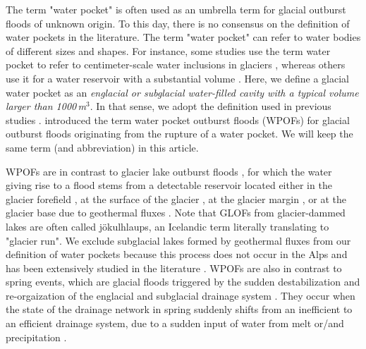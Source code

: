 The term "water pocket" is often used as an umbrella term for glacial outburst floods of unknown origin. To this day, there is no consensus on the definition of water pockets in the literature. The term "water pocket" can refer to water bodies of different sizes and shapes. For instance, some studies use the term water pocket to refer to centimeter-scale water inclusions in glaciers \citep[]{Vivian&Bocquet1973,Raymond&Harrison1975,Holmlund1988,Fountain&Walder1998,Murray&al2000b}, whereas others use it for a water reservoir with a substantial volume \citep[]{Beecroft1983, Haeberli&al1989,Tweed&Russel1999,Vincent&al2010b}. Here, we define a glacial water pocket as an {\it englacial or subglacial water-filled cavity with a typical volume larger than 1000\,m$^3$}. In that sense, we adopt the definition used in previous studies \citep[]{Haeberli&al1989,Deline&al2004,Roberts2005, Vincent&al2010b}. \cite{Deline&al2004} introduced the term water pocket outburst floods (WPOFs) for glacial outburst floods originating from the rupture of a water pocket. We will keep the same term (and abbreviation) in this article.


WPOFs are in contrast to glacier lake outburst floods \citep[GLOFs, see][for reviews]{Roberts2005, Bjornsson2010,Carrivick&Tweed2016,Emmer&al2022,Zhang&al2024}, for which the water giving rise to a flood stems from a detectable reservoir located either in the glacier forefield \citep[i.e.\ proglacial lake, see][for a review]{Neupane&al2019}, at the surface of the glacier \citep[i.e.\ supraglacial lake, e.g.][]{Walder&Costa1996,Raymond&al2003,Kingslake&al2015}, at the glacier margin \citep[i.e.\ ice-marginal lake, e.g.][]{Huss&al2007}, or at the glacier base due to geothermal fluxes \citep[i.e.\ subglacial lake, see][]{Bjornsson2010}. Note that GLOFs from glacier-dammed lakes are often called jökulhlaups, an Icelandic term literally translating to "glacier run". We exclude subglacial lakes formed by geothermal fluxes from our definition of water pockets because this process does not occur in the Alps and has been extensively studied in the literature \citep[e.g.][]{Bjornsson2010,Livingstone&al2022}. WPOFs are also in contrast to spring events, which are glacial floods triggered by the sudden destabilization and re-orgaization of the englacial and subglacial drainage system \citep[e.g.][]{Iken&Bindschadler1986, Kamb1987,Warburton&Fenn1994}. They occur when the state of the drainage network in spring suddenly shifts from an inefficient to an efficient drainage system, due to a sudden input of water from melt or/and precipitation \citep[e.g.][]{Walder&Driedger1995}. 

